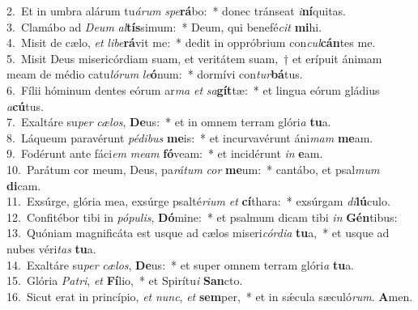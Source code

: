 {2.~}Et in umbra alárum tu\textit{á}\textit{rum} \textit{spe}\textbf{rá}bo:~* donec tránseat \textit{i}\textbf{ní}quitas.\\
{3.~}Clamábo ad \textit{De}\textit{um} \textit{al}\textbf{tís}simum:~* Deum, qui benefé\textit{cit} \textbf{mi}hi.\\
{4.~}Misit de cælo, \textit{et} \textit{li}\textit{be}\textbf{rá}vit me:~* dedit in oppróbrium con\textit{cul}\textbf{cán}tes me.\\
{5.~}Misit Deus misericórdiam suam, et veritátem suam,~† et erípuit ánimam meam de médio catu\textit{ló}\textit{rum} \textit{le}\textbf{ó}num:~* dormívi con\textit{tur}\textbf{bá}tus.\\
{6.~}Fílii hóminum dentes eórum ar\textit{ma} \textit{et} \textit{sa}\textbf{gít}tæ:~* et lingua eórum gládius \textit{a}\textbf{cú}tus.\\
{7.~}Exaltáre su\textit{per} \textit{cæ}\textit{los}, \textbf{De}us:~* et in omnem terram glóri\textit{a} \textbf{tu}a.\\
{8.~}Láqueum paravérunt \textit{pé}\textit{di}\textit{bus} \textbf{me}is:~* et incurvavérunt áni\textit{mam} \textbf{me}am.\\
{9.~}Fodérunt ante fáci\textit{em} \textit{me}\textit{am} \textbf{fó}veam:~* et incidérunt \textit{in} \textbf{e}am.\\
{10.~}Parátum cor meum, Deus, pa\textit{rá}\textit{tum} \textit{cor} \textbf{me}um:~* cantábo, et psal\textit{mum} \textbf{di}cam.\\
{11.~}Exsúrge, glória mea, exsúrge psalté\textit{ri}\textit{um} \textit{et} \textbf{cí}thara:~* exsúrgam \textit{di}\textbf{lú}culo.\\
{12.~}Confitébor tibi in \textit{pó}\textit{pu}\textit{lis}, \textbf{Dó}mine:~* et psalmum dicam tibi \textit{in} \textbf{Gén}tibus:\\
{13.~}Quóniam magnificáta est usque ad cælos miseri\textit{cór}\textit{di}\textit{a} \textbf{tu}a,~* et usque ad nubes véri\textit{tas} \textbf{tu}a.\\
{14.~}Exaltáre su\textit{per} \textit{cæ}\textit{los}, \textbf{De}us:~* et super omnem terram glóri\textit{a} \textbf{tu}a.\\
{15.~}Glória \textit{Pa}\textit{tri}, \textit{et} \textbf{Fí}lio,~* et Spirítu\textit{i} \textbf{San}cto.\\
{16.~}Sicut erat in princípio, \textit{et} \textit{nunc}, \textit{et} \textbf{sem}per,~* et in sǽcula sæculó\textit{rum}. \textbf{A}men.\\
